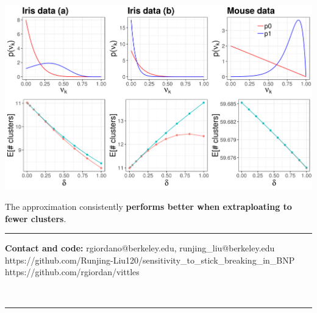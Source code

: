 \documentclass[a0,plainsections,30pt]{sciposter}\usepackage[]{graphicx}\usepackage[]{color}
\newenvironment{knitrout}{}{} %
\begin{document}
\begin{minipage}[t]{0.45\textwidth}
\begin{knitrout}
{\centering \includegraphics[width=0.98\linewidth,height=0.588\linewidth]{figure/functional_sens_plot-1} 

}



\end{knitrout}

The approximation consistently \textbf{performs better when extraploating to
fewer clusters}.

\noindent\rule{0.95\textwidth}{1pt}

{\bf Contact and code: } rgiordano@berkeley.edu, runjing\_liu@berkeley.edu
{\color{blue} https://github.com/Runjing-Liu120/sensitivity\_to\_stick\_breaking\_in\_BNP}
{\color{blue} https://github.com/rgiordan/vittles}

% 

\end{minipage}\\

\begin{center}
\noindent\rule{0.95\textwidth}{1pt}
\end{center}


\renewcommand{\section}[2]{}%
\footnotesize{
  
  
}
\end{document}
